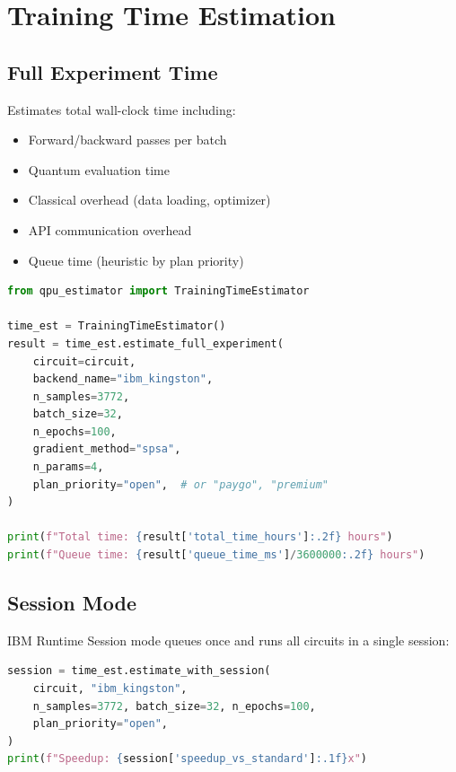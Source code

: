 \documentclass[11pt,a4paper]{article}
\begin{document}
\section{Training Time Estimation}

\subsection{Full Experiment Time}

Estimates total wall-clock time including:

\begin{itemize}[leftmargin=2em]
    \item Forward/backward passes per batch
    \item Quantum evaluation time
    \item Classical overhead (data loading, optimizer)
    \item API communication overhead
    \item Queue time (heuristic by plan priority)
\end{itemize}

\begin{lstlisting}[language=Python,caption=Training Time Estimation]
from qpu_estimator import TrainingTimeEstimator

time_est = TrainingTimeEstimator()
result = time_est.estimate_full_experiment(
    circuit=circuit,
    backend_name="ibm_kingston",
    n_samples=3772,
    batch_size=32,
    n_epochs=100,
    gradient_method="spsa",
    n_params=4,
    plan_priority="open",  # or "paygo", "premium"
)

print(f"Total time: {result['total_time_hours']:.2f} hours")
print(f"Queue time: {result['queue_time_ms']/3600000:.2f} hours")
\end{lstlisting}

\subsection{Session Mode}

IBM Runtime Session mode queues once and runs all circuits in a single session:

\begin{lstlisting}[language=Python,caption=Session Mode Estimation]
session = time_est.estimate_with_session(
    circuit, "ibm_kingston",
    n_samples=3772, batch_size=32, n_epochs=100,
    plan_priority="open",
)
print(f"Speedup: {session['speedup_vs_standard']:.1f}x")
\end{lstlisting}
\end{document}
